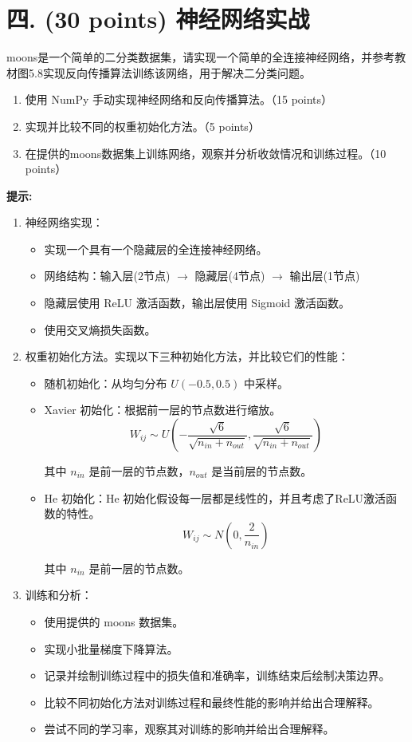 \documentclass[8pt]{article}
\begin{document}
\vspace{3em}

\section*{四. (30 points) 神经网络实战}
moons是一个简单的二分类数据集，请实现一个简单的全连接神经网络，并参考教材图5.8实现反向传播算法训练该网络，用于解决二分类问题。
\begin{enumerate}
    \item 使用 NumPy 手动实现神经网络和反向传播算法。（15 points）
    \item 实现并比较不同的权重初始化方法。（5 points）
    \item 在提供的moons数据集上训练网络，观察并分析收敛情况和训练过程。（10 points）
\end{enumerate}

\textbf{提示:}

\begin{enumerate}
    \item 神经网络实现：
\begin{itemize}
    \item 实现一个具有一个隐藏层的全连接神经网络。
    \item 网络结构：输入层(2节点) $\rightarrow$ 隐藏层(4节点) $\rightarrow$ 输出层(1节点)
    \item 隐藏层使用 ReLU 激活函数，输出层使用 Sigmoid 激活函数。
    \item 使用交叉熵损失函数。
\end{itemize}
    \item 权重初始化方法。实现以下三种初始化方法，并比较它们的性能：
\begin{itemize}
    \item 随机初始化：从均匀分布 $U(-0.5, 0.5)$ 中采样。
    \item Xavier 初始化：根据前一层的节点数进行缩放。
    \[ W_{ij} \sim U\left( -\frac{\sqrt{6}}{\sqrt{n_{in} + n_{out}}}, \frac{\sqrt{6}}{\sqrt{n_{in} + n_{out}}} \right) \]

其中 \(n_{in}\) 是前一层的节点数，\(n_{out}\) 是当前层的节点数。
    \item He 初始化：He 初始化假设每一层都是线性的，并且考虑了ReLU激活函数的特性。\[ W_{ij} \sim N\left( 0, \frac{2}{n_{in}} \right) \]

其中 \(n_{in}\) 是前一层的节点数。
\end{itemize}
    \item 训练和分析：
\begin{itemize}
    \item 使用提供的 moons 数据集。
    \item 实现小批量梯度下降算法。
    \item 记录并绘制训练过程中的损失值和准确率，训练结束后绘制决策边界。
    \item 比较不同初始化方法对训练过程和最终性能的影响并给出合理解释。
    \item 尝试不同的学习率，观察其对训练的影响并给出合理解释。
\end{itemize}
\end{enumerate}
\end{document}
